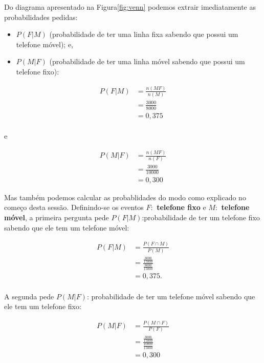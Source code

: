 \documentclass[
]{book}
\providecommand{\tightlist}{%
  \setlength{\itemsep}{0pt}\setlength{\parskip}{0pt}}
\begin{document}
\hfill\break

Do diagrama apresentado na Figura\ref{fig:venn} podemos extrair imediatamente as probabilidades pedidas:

\begin{itemize}
\tightlist
\item
  \(P(F|M)\) (probabilidade de ter uma linha fixa sabendo que possui um telefone móvel); e,
\item
  \(P(M|F)\) (probabilidade de ter uma linha móvel sabendo que possui um telefone fixo):
\end{itemize}

\hfill\break

\begin{align*}
P(F|M) & = \frac{n(MF)}{n(M)}\\
       & =\frac{3000}{8000}\\
       & = 0,375 
\end{align*}\\

e

\hfill\break

\begin{align*}
P(M|F) & = \frac{n(MF)}{n(F)} \\
       & =\frac{3000}{10000} \\
       & = 0,300 
\end{align*}

\hfill\break

Mas também podemos calcular as probablidades do modo como explicado no começo desta sessão. Definindo-se os eventos \textbf{\(F:\) telefone fixo} e \textbf{\(M:\) telefone móvel}, a primeira pergunta pede \(P(F|M)\):probabilidade de ter um telefone fixo sabendo que ele tem um telefone móvel:

\hfill\break

\begin{align*}
P(F|M) & =  \frac{P(F \cap M)}{P(M)} \\
       & = \frac{ \frac{3000}{15000} }{\frac{8000}{15000} }\\
       & = 0,375.
\end{align*}\\

A segunda pede \(P(M|F)\): probabilidade de ter um telefone móvel sabendo que ele tem um telefone fixo:

\hfill\break

\begin{align*}
P(M|F) & = \frac{P(M \cap F)}{P(F)} \\
       & = \frac{ \frac{3000}{15000} }{\frac{10000}{15000} } \\
       & = 0,300
\end{align*}
\end{document}
